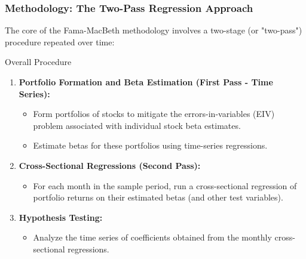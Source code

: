 \documentclass[10pt]{beamer}
\begin{document}
\begin{frame}
  \frametitle{Methodology: The Two-Pass Regression Approach}
  The core of the Fama-MacBeth methodology involves a two-stage (or "two-pass") procedure repeated over time:

  \begin{block}{Overall Procedure}
  \begin{enumerate}
    \item \textbf{Portfolio Formation and Beta Estimation (First Pass - Time Series):}
        \begin{itemize}
            \item Form portfolios of stocks to mitigate the errors-in-variables (EIV) problem associated with individual stock beta estimates.
            \item Estimate betas for these portfolios using time-series regressions.
        \end{itemize}
    \item \textbf{Cross-Sectional Regressions (Second Pass):}
        \begin{itemize}
            \item For each month in the sample period, run a cross-sectional regression of portfolio returns on their estimated betas (and other test variables).
        \end{itemize}
    \item \textbf{Hypothesis Testing:}
        \begin{itemize}
            \item Analyze the time series of coefficients obtained from the monthly cross-sectional regressions.
        \end{itemize}
  \end{enumerate}
  \end{block}
\end{frame}
\end{document}
